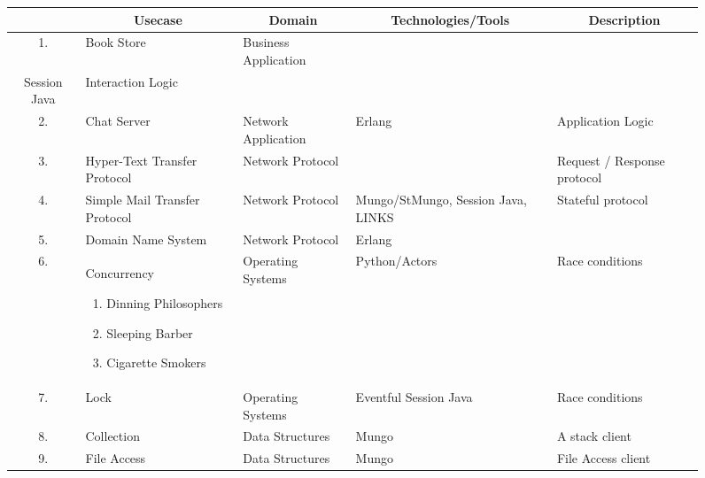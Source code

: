 \begin{figure}
	\begin{longtable}{| c | p{3cm} | p{3cm} | p{2.5cm} | p{2.5cm} | }
		\hline
			&	\multicolumn{1}{c|}{Usecase}
							&	\multicolumn{1}{c|}{Domain}
														&	\multicolumn{1}{c|}{Technologies/Tools}
																					&	\multicolumn{1}{c|}{Description}
		\\
		\hline
		1.	&	Book Store	&	Business Application	&	\begin{tabular}{l}
																Mungo,\\
																Session Java
															\end{tabular}
																					&	Interaction Logic
		\\

		\hline
		2.	&	Chat Server	&	Network Application		&	Erlang					&	Application Logic
		\\

		\hline
		3.	&	Hyper-Text Transfer Protocol
							&	Network Protocol		&							&	Request / Response protocol
		\\

		\hline
		4.	&	Simple Mail Transfer Protocol
							&	Network Protocol		&	Mungo/StMungo, Session Java, LINKS
																					&	Stateful protocol
		\\
		\hline
		5.	&	Domain Name System
							&	Network Protocol 		&	Erlang
																					&	
		\\
		\hline
		6.	&	Concurrency
				\begin{enumerate}[label=$\bullet$]
					\item	Dinning Philosophers
					\item	Sleeping Barber
					\item	Cigarette Smokers
				\end{enumerate}
							&	Operating Systems		&	Python/Actors			&	Race conditions
		\\
		\hline
		7.	&	Lock		&	Operating Systems		&	Eventful Session Java	&	Race conditions
		\\

		\hline
		8.	&	Collection	&	Data Structures			&	Mungo					&	A stack client
		\\

		\hline
		9.	&	File Access	&	Data Structures			&	Mungo					&	File Access client
		\\


\end{longtable}
\end{figure}
